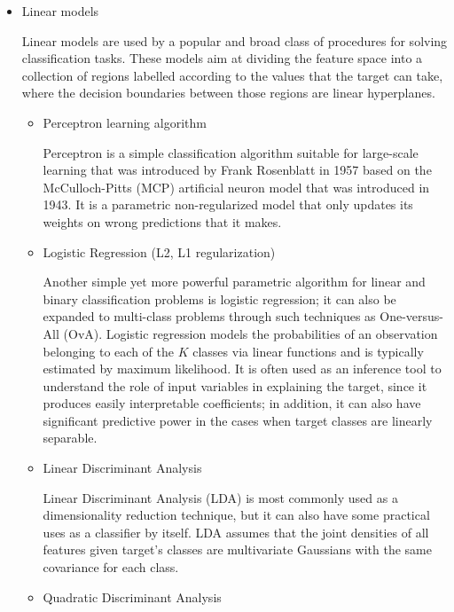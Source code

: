 \begin{itemize}
    \item Linear models

    Linear models are used by a popular and broad class of procedures for solving classification tasks.
    These models aim at dividing the feature space into a collection of regions labelled according to the values that the target can take, where the decision boundaries between those regions are linear hyperplanes.

    \begin{itemize}
        \item Perceptron learning algorithm

        Perceptron is a simple classification algorithm suitable for large-scale learning that was introduced by Frank Rosenblatt\cite{Rosenblatt1957a} in 1957 based on the McCulloch-Pitts (MCP) artificial neuron model\cite{McCulloch1990a} that was introduced in 1943.
        It is a parametric non-regularized model that only updates its weights on wrong predictions that it makes.

        \item Logistic Regression (L2, L1 regularization)

        Another simple yet more powerful parametric algorithm for linear and binary classification problems is logistic regression;
        it can also be expanded to multi-class problems through such techniques as One-versus-All (OvA).
        Logistic regression models the probabilities of an observation belonging to each of the $K$ classes via linear functions and is typically estimated by maximum likelihood.
        It is often used as an inference tool to understand the role of input variables in explaining the target, since it produces easily interpretable coefficients;
        in addition, it can also have significant predictive power in the cases when target classes are linearly separable\cite{RaschkaMirjalili2017}.

        \item Linear Discriminant Analysis

        Linear Discriminant Analysis (LDA) is most commonly used as a dimensionality reduction technique, but it can also have some practical uses as a classifier by itself.
        LDA assumes that the joint densities of all features given target's classes are multivariate Gaussians with the same covariance for each class.

        \item Quadratic Discriminant Analysis


\end{itemize}
\end{itemize}
